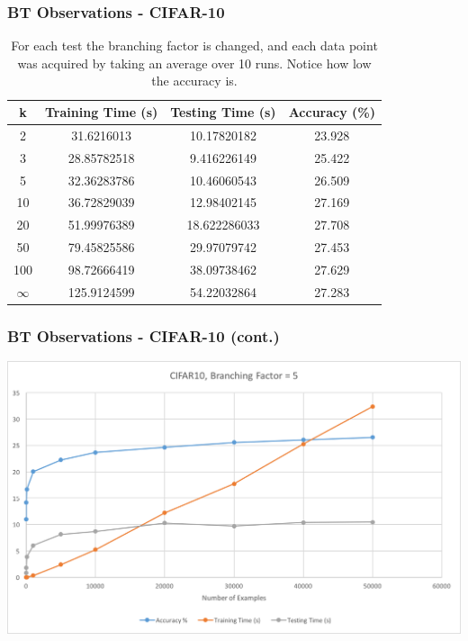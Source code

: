 \documentclass[pdf]{beamer}
\begin{document}
	\begin{frame}
	\frametitle{BT Observations - CIFAR-10}
		\begin{table}
			\begin{tabular}{|c|c|c|c|}
				\hline 
				\rule[-1ex]{0pt}{2.5ex} \textbf{k} & \textbf{Training Time (s)} & \textbf{Testing Time (s)} & \textbf{Accuracy (\%)} \\ 
				\hline 
				\rule[-1ex]{0pt}{2.5ex} 2 & 31.6216013
 & 10.17820182 & 23.928 \\ 
				\hline 
				\rule[-1ex]{0pt}{2.5ex} 3 & 28.85782518 & 9.416226149 & 25.422 \\ 
				\hline 
				\rule[-1ex]{0pt}{2.5ex} 5 & 32.36283786 & 10.46060543 & 26.509 \\ 
				\hline 
				\rule[-1ex]{0pt}{2.5ex} 10 & 36.72829039 & 12.98402145 & 27.169 \\ 
				\hline 
				\rule[-1ex]{0pt}{2.5ex} 20 & 51.99976389 & 18.622286033 & 27.708 \\ 
				\hline 
				\rule[-1ex]{0pt}{2.5ex} 50 & 79.45825586 & 29.97079742 & 27.453 \\ 
				\hline 
				\rule[-1ex]{0pt}{2.5ex} 100 & 98.72666419& 38.09738462 & 27.629 \\ 
				\hline 
				\rule[-1ex]{0pt}{2.5ex} $\infty$ & 125.9124599 & 54.22032864 & 27.283 \\ 
				\hline 
			\end{tabular} 
			\caption{For each test the branching factor is changed, and each data point was acquired by taking an average over 10 runs. Notice how low the accuracy is. }
		\end{table}
	\end{frame}
	\begin{frame}
		\frametitle{BT Observations - CIFAR-10 (cont.)}
		\includegraphics[scale=0.5]{Graphics/CIFAR_k5}
	\end{frame}
\end{document}
